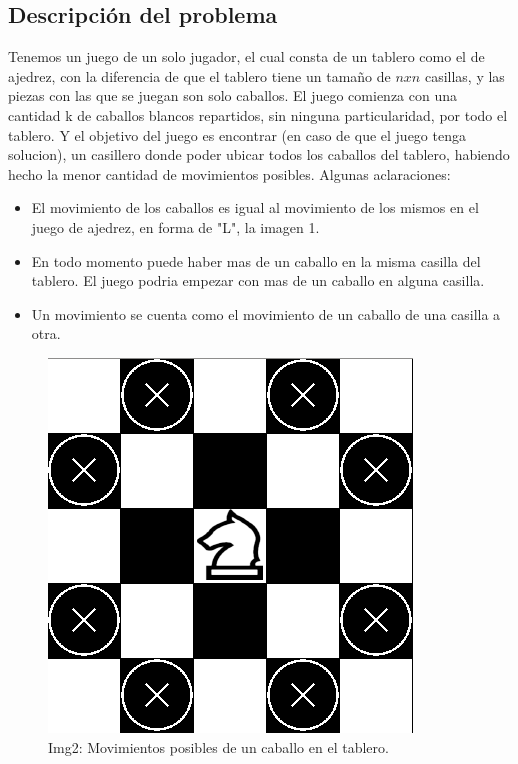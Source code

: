 \subsection{Descripci\'on del problema}

Tenemos un juego de un solo jugador, el cual consta de un tablero como el de ajedrez, con la diferencia de que el tablero tiene un tamaño de $n x n$ casillas, y las piezas con las que se juegan son solo caballos. El juego comienza con una cantidad k de caballos blancos repartidos, sin ninguna particularidad, por todo el tablero. Y el objetivo del juego es encontrar (en caso de que el juego tenga solucion), un casillero donde poder ubicar todos los caballos del tablero, habiendo hecho la menor cantidad de movimientos posibles. 
Algunas aclaraciones:
\begin{itemize}
\item El movimiento de los caballos es igual al movimiento de los mismos en el juego de ajedrez, en forma de "L", la imagen 1.
\item En todo momento puede haber mas de un caballo en la misma casilla del tablero. El juego podria empezar con mas de un caballo en alguna casilla.
\item Un movimiento se cuenta como el movimiento de un caballo de una casilla a otra.
\end{itemize}

\begin{figure}[H]
\begin{center}
\includegraphics[scale=.45]{./imagenes/ej2_movimientoCaballo.png}
\caption{Img2: Movimientos posibles de un caballo en el tablero.}
\end{center}
\end{figure}

